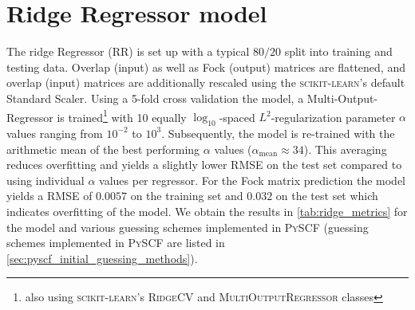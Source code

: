 \section{Ridge Regressor model} %
\label{sec:ridge_regressor_model}
The ridge Regressor (RR) is set up with a typical $80 / 20$ split into training and testing data. Overlap (input) as well as Fock (output) matrices are flattened, and overlap (input) matrices are additionally rescaled using the \textsc{scikit-learn}'s default Standard Scaler. \parencite{ref:sk-learn} Using a 5-fold cross validation the model, a Multi-Output-Regressor is trained\footnote{also using \textsc{scikit-learn}'s \textsc{RidgeCV} and \textsc{MultiOutputRegressor} classes} with 10 equally $\log_{10}$-spaced $L^2$-regularization parameter $\alpha$ values ranging from $10^{-2}$ to $10^{3}$. Subsequently, the model is re-trained with the arithmetic mean of the best performing $\alpha$ values ($\alpha_{\text{mean}} \approx 34$). This averaging reduces overfitting and yields a slightly lower RMSE on the test set compared to using individual $\alpha$ values per regressor. %
For the Fock matrix prediction the model yields a RMSE of $0.0057$ on the training set and $0.032$ on the test set which indicates overfitting of the model. We obtain the results in \autoref{tab:ridge_metrics} for the model and various guessing schemes implemented in \textsc{PySCF} (guessing schemes implemented in \textsc{PySCF} are listed in \autoref{sec:pyscf_initial_guessing_methods}).
